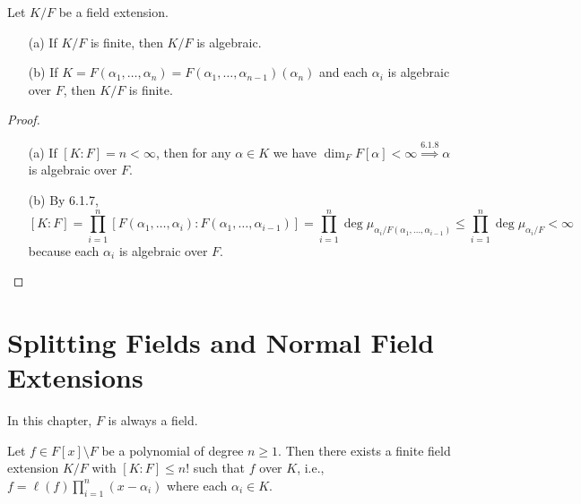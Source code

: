 \documentclass[11pt]{book}
\theoremstyle{definition}   \newtheorem{defn}[counter]{Definition} %
\newcommand{\bs}{\setminus}   \newcommand{\A}{\mathcal{A}}   \newcommand{\sy}{\textnormal{Syl}}   \newcommand{\size}[1]{\left| #1 \right|}
\newcommand{\vs}{\vspace{8pt}}
\numberwithin{counter}{chapter}
\begin{document}
\vs

\begin{lemma}
Let $K/F$ be a field extension. 
\begin{enumerate}
\item[(a)] If $K/F$ is finite, then $K/F$ is algebraic. 
\item[(b)] If $K = F(\alpha_1,\dots,\alpha_n) = F(\alpha_1,\dots,\alpha_{n-1})(\alpha_n)$ and each $\alpha_i$ is algebraic over $F$, then $K/F$ is finite.
\end{enumerate}
\end{lemma}

\begin{proof} \
\begin{enumerate}
\item[(a)] If $[K : F] = n < \infty$, then for any $\alpha \in K$ we have $\dim_F F[\alpha] < \infty \overset{6.1.8}{\implies} \alpha$ is algebraic over $F$. 
\item[(b)] By 6.1.7, 
	\[[K : F] = \prod_{i=1}^n [F(\alpha_1,\dots,\alpha_i) : F(\alpha_1,\dots,\alpha_{i-1})] = \prod_{i=1}^n \deg \mu_{\alpha_i/F(\alpha_1,\dots,\alpha_{i-1})} \leq \prod_{i=1}^n \deg \mu_{\alpha_i/F} < \infty \]
because each $\alpha_i$ is algebraic over $F$.
\end{enumerate}
\end{proof}

\vs

\chapter{Splitting Fields and Normal Field Extensions}



In this chapter, $F$ is always a field. 

\vs

\begin{lemma}
Let $f \in F[x] \bs F$ be a polynomial of degree $n \geq 1$. Then there exists a finite field extension $K/F$ with $[K : F] \leq n!$ such that $f$  over $K$, i.e., $f = \ell(f) \prod_{i=1}^n (x-\alpha_i)$ where each $\alpha_i \in K$. 
\end{lemma}
\end{document}
